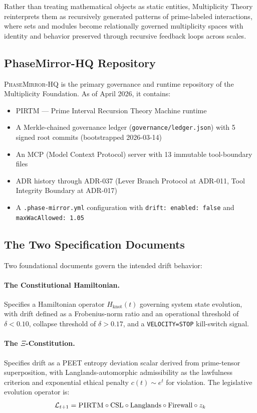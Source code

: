 \documentclass[11pt,letterpaper]{article}
\theoremstyle{definition}
\theoremstyle{remark}
\newcommand{\pirtm}{\textsc{PIRTM}}
\newcommand{\pmhq}{\textsc{PhaseMirror-HQ}}
\newcommand{\xicons}{\(\Xi\)-Constitution}
\begin{document}
Rather than treating mathematical objects as static entities,
Multiplicity Theory reinterprets them as recursively generated
patterns of prime-labeled interactions, where sets and modules
become relationally governed multiplicity spaces with identity
and behavior preserved through recursive feedback loops across scales.

\subsection{PhaseMirror-HQ Repository}

\pmhq{} is the primary governance and runtime repository of the
Multiplicity Foundation. As of April 2026, it contains:

\begin{itemize}[leftmargin=2em]
  \item \pirtm{} --- Prime Interval Recursion Theory Machine runtime
  \item A Merkle-chained governance ledger (\texttt{governance/ledger.json})
        with 5 signed root commits (bootstrapped 2026-03-14)
  \item An MCP (Model Context Protocol) server with 13 immutable
        tool-boundary files
  \item ADR history through ADR-037 (Lever Branch Protocol at ADR-011,
        Tool Integrity Boundary at ADR-017)
  \item A \texttt{.phase-mirror.yml} configuration with \texttt{drift: enabled: false}
        and \texttt{maxWacAllowed: 1.05}
\end{itemize}

\subsection{The Two Specification Documents}

Two foundational documents govern the intended drift behavior:

\paragraph{The Constitutional Hamiltonian.}
Specifies a Hamiltonian operator \(H_{\text{knot}}(t)\) governing
system state evolution, with drift defined as a Frobenius-norm ratio
and an operational threshold of \(\delta < 0.10\), collapse threshold
of \(\delta > 0.17\), and a \texttt{VELOCITY=STOP} kill-switch signal.

\paragraph{The \xicons{}.}
Specifies drift as a PEET entropy deviation scalar derived from
prime-tensor superposition, with Langlands-automorphic admissibility
as the lawfulness criterion and exponential ethical penalty \(c(t) \sim e^t\)
for violation. The legislative evolution operator is:
\[
  \mathcal{L}_{t+1} = \pirtm \circ \text{CSL} \circ \text{Langlands} \circ \text{Firewall} \circ z_k
\]
\end{document}
